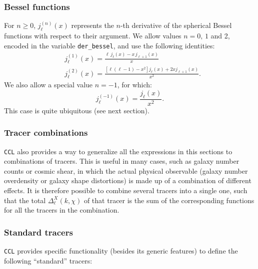\documentclass[\docopts]{\docclass}
\begin{document}
\subsubsection*{Bessel functions}
  For $n\ge0$, $j^{(n)}_\ell(x)$ represents the $n$-th derivative of the spherical Bessel functions with respect to their argument. We allow values $n=0,\,1$ and 2, encoded in the variable {\tt der\_bessel}, and use the following identities:
  \begin{align}
    &j^{(1)}_\ell(x)=\frac{\ell\,j_\ell(x)-x\,j_{\ell+1}(x)}{x}\\
    &j^{(2)}_\ell(x)=\frac{[\ell(\ell-1)-x^2]j_\ell(x)+2xj_{\ell+1}(x)}{x^2}.
  \end{align}
  We also allow a special value $n=-1$, for which:
  \begin{equation}
    j^{(-1)}_\ell(x)=\frac{j_\ell(x)}{x^2}.
  \end{equation}
  This case is quite ubiquitous (see next section).

\subsubsection*{Tracer combinations}
{\tt CCL} also provides a way to generalize all the expressions in this sections
to combinations of tracers. This is useful in many cases, such as galaxy number
counts or cosmic shear, in which the actual physical observable (galaxy number
overdensity or galaxy shape distortions) is made up of a combination of
different effects. It is therefore possible to combine several tracers into a
single one, such that the total $\Delta^X_\ell(k,\chi)$ of that tracer is the
sum of the corresponding functions for all the tracers in the combination.

\subsubsection*{Standard tracers}
{\tt CCL} provides specific functionality (besides its generic features) to define the following ``standard'' tracers:
\end{document}
